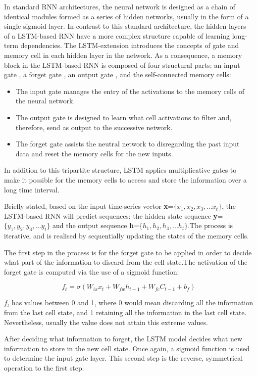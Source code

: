 \documentclass[10pt,twocolumn,letterpaper]{article}
\begin{document}
In standard RNN architectures, the neural network is designed as a chain of identical modules formed as a series of hidden networks, usually in the form of a single sigmoid layer. In contrast to this standard architecture, the hidden layers of a LSTM-based RNN have a more complex structure capable of learning long-term dependencies. The LSTM-extension introduces the concepts of gate and memory cell in each hidden layer in the network. As a consequence, a memory block in the LSTM-based RNN is composed of four structural parts: an input gate , a forget gate , an output gate , and the self-connected memory cells:
\begin{itemize}
    \item The input gate manages the entry of the activations to the memory cells of the neural network.
    \item The output gate is designed to learn what cell activations to filter and, therefore, send as output to the successive network.
    \item The forget gate assists the neutral network to disregarding the past input data and reset the memory cells for the new inputs.
\end{itemize}
In addition to this tripartite structure, LSTM applies multiplicative gates to make it possible for the memory cells to access and store the information over a long time interval.

Briefly stated, based on the input time-series vector \textbf{x}=$\{x_1,x_2,x_3,...x_t\}$, the LSTM-based RNN will predict sequences: the hidden state sequence  \textbf{y}=$\{y_1,y_2,y_3,...y_t\}$ and the output sequence \textbf{h}=$\{h_1,h_2,h_3,...h_t\}$.The process is iterative, and is realised by sequentially updating the states of the memory cells.

The first step in the process is for the forget gate to be applied in order to decide what part of the information to discard from the cell state.The activation of the forget gate is computed via the use of a sigmoid function:

$$f_t=\sigma(W_{ix}x_t+ W_{fw}h_{t-1}+W_{fc}C_{t-1}+b_f) $$

 $f_t$ has values between 0 and 1, where 0 would mean discarding all the information from the last cell state, and 1 retaining all the information in the last cell state. Nevertheless, usually the value does not attain this extreme values.
 
After deciding what information to forget, the LSTM model decides what new information to store in the new cell state. Once again, a sigmoid function is used to determine the input gate layer. This second step is the reverse, symmetrical operation to the first step.
\end{document}
